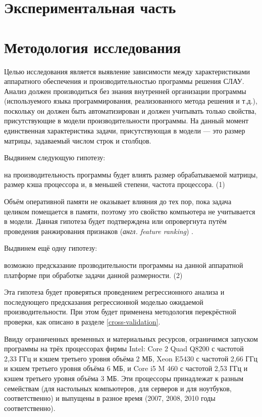 \section{Экспериментальная часть}

\section{Методология исследования}

Целью исследования является выявление зависимости между характеристиками аппаратного обеспечения и производительностью программы решения СЛАУ. Анализ должен производиться без знания внутренней организации программы (используемого языка программирования, реализованного метода решения и т.д.), поскольку он должен быть автоматизирован и должен учитывать только свойства, присутствующие в модели производительности программы. На данный момент единственная характеристика задачи, присутствующая в модели --- это размер матрицы, задаваемый числом строк и столбцов.

Выдвинем следующую гипотезу: 

на производительность программы будет влиять размер обрабатываемой матрицы, размер кэша процессора и, в меньшей степени, частота процессора. (1)

Объём оперативной памяти не оказывает влияния до тех пор, пока задача целиком помещается в памяти, поэтому это свойство компьютера не учитывается в модели. Данная гипотеза будет подтверждена или опровергнута путём проведения ранжирования признаков (\textit{англ. feature ranking}) \cite{feature-ranking}.

Выдвинем ещё одну гипотезу:

возможно предсказание прозводительности программы на данной аппаратной платформе при обработке задачи данной размерности. (2)

Эта гипотеза будет проверяться проведением регрессионного анализа и последующего предсказания регрессионной моделью ожидаемой производительности. При этом будет применена методология перекрёстной проверки, как описано в разделе \ref{cross-validation}.

Ввиду ограниченных временных и материальных ресурсов, ограничимся запуском программы на трёх процессорах фирмы Intel:  Core 2 Quad Q8200 с частотой 2,33 ГГц и кэшем третьего уровня объёма 2 МБ, Xeon E5430 с частотой 2,66 ГГц и кэшем третьего уровня объёма 6 МБ, и Core i5 M 460 с частотой 2,53 ГГц и кэшем третьего уровня объёма 3 МБ. Эти процессоры принадлежат к разным семействам (для настольных компьютеров, для серверов и для ноутбуков, соответственно) и выпущены в разное время (2007, 2008, 2010 годы соответственно).

